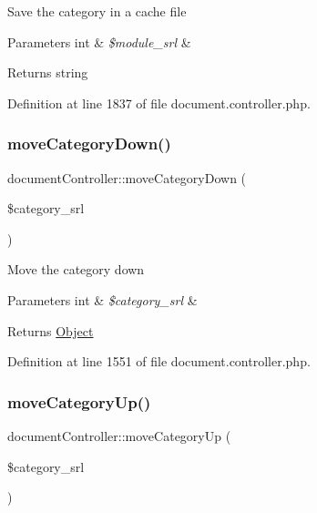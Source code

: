Save the category in a cache file 
\begin{DoxyParams}[1]{Parameters}
int & {\em \$module\+\_\+srl} & \\
\hline
\end{DoxyParams}
\begin{DoxyReturn}{Returns}
string 
\end{DoxyReturn}


Definition at line 1837 of file document.\+controller.\+php.

\mbox{\label{classdocumentController_ab6befd47268a1fbfcc56dda3c3a71dc4}} 
\subsubsection{\texorpdfstring{move\+Category\+Down()}{moveCategoryDown()}}
{\footnotesize\ttfamily document\+Controller\+::move\+Category\+Down (\begin{DoxyParamCaption}\item[{}]{\$category\+\_\+srl }\end{DoxyParamCaption})}

Move the category down 
\begin{DoxyParams}[1]{Parameters}
int & {\em \$category\+\_\+srl} & \\
\hline
\end{DoxyParams}
\begin{DoxyReturn}{Returns}
\hyperlink{classObject}{Object} 
\end{DoxyReturn}


Definition at line 1551 of file document.\+controller.\+php.

\mbox{\label{classdocumentController_a16a00fabad8b270e40d7fa196350280c}} 
\subsubsection{\texorpdfstring{move\+Category\+Up()}{moveCategoryUp()}}
{\footnotesize\ttfamily document\+Controller\+::move\+Category\+Up (\begin{DoxyParamCaption}\item[{}]{\$category\+\_\+srl }\end{DoxyParamCaption})}

